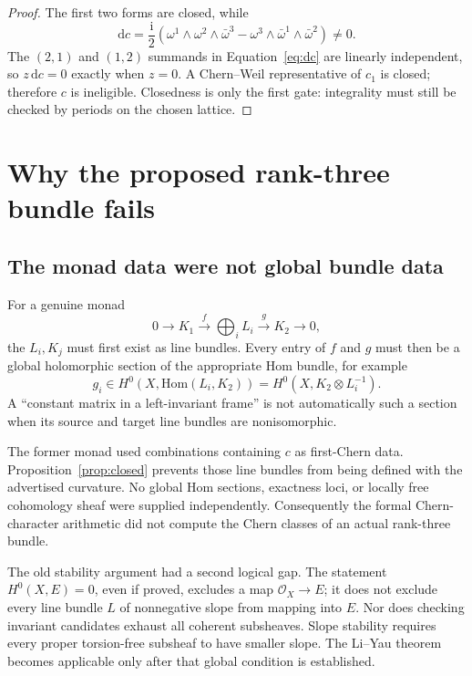\documentclass[11pt]{article}
\newcommand{\ii}{\mathrm{i}}
\newcommand{\dd}{\mathrm{d}}
\newcommand{\cO}{\mathcal{O}}
\newcommand{\Hom}{\mathrm{Hom}}
\theoremstyle{definition}
\theoremstyle{remark}
\begin{document}
\begin{proof}
The first two forms are closed, while
\begin{equation}
\dd c=\frac{\ii}{2}\left(
\omega^1\wedge\omega^2\wedge\bar\omega^3
-\omega^3\wedge\bar\omega^1\wedge\bar\omega^2\right)\neq0.
\label{eq:dc}
\end{equation}
The \((2,1)\) and \((1,2)\) summands in Equation~\eqref{eq:dc} are linearly
independent, so \(z\,\dd c=0\) exactly when \(z=0\).
A Chern--Weil representative of \(c_1\) is closed; therefore \(c\) is
ineligible.  Closedness is only the first gate: integrality must still be
checked by periods on the chosen lattice.
\end{proof}

\section{Why the proposed rank-three bundle fails}
\label{sec:bundle}

\subsection{The monad data were not global bundle data}

For a genuine monad
\[
0\longrightarrow K_1\stackrel{f}{\longrightarrow}
\bigoplus_i L_i\stackrel{g}{\longrightarrow}K_2
\longrightarrow0,
\]
the \(L_i,K_j\) must first exist as line bundles.  Every entry of \(f\) and
\(g\) must then be a global holomorphic section of the appropriate Hom bundle,
for example
\[
g_i\in H^0\!\left(X,\Hom(L_i,K_2)\right)
=H^0\!\left(X,K_2\otimes L_i^{-1}\right).
\]
A ``constant matrix in a left-invariant frame'' is not automatically such a
section when its source and target line bundles are nonisomorphic.

The former monad used combinations containing \(c\) as first-Chern data.
Proposition~\ref{prop:closed} prevents those line bundles from being defined
with the advertised curvature.  No global Hom sections, exactness loci, or
locally free cohomology sheaf were supplied independently.  Consequently the
formal Chern-character arithmetic did not compute the Chern classes of an
actual rank-three bundle.

The old stability argument had a second logical gap.  The statement
\(H^0(X,E)=0\), even if proved, excludes a map \(\cO_X\to E\); it does not
exclude every line bundle \(L\) of nonnegative slope from mapping into \(E\).
Nor does checking invariant candidates exhaust all coherent subsheaves.
Slope stability requires every proper torsion-free subsheaf to have smaller
slope.  The Li--Yau theorem becomes applicable only after that global
condition is established.
\end{document}
